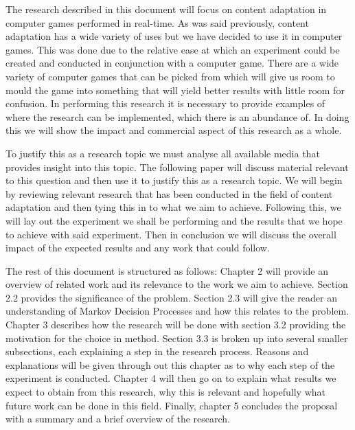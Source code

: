 \documentclass[11pt]{article}
\begin{document}
The research described in this document will focus on content adaptation in computer games performed in real-time. As was said previously, content adaptation has a wide variety of uses but we have decided to use it in computer games. This was done due to the relative ease at which an experiment could be created and conducted in conjunction with a computer game. There are a wide variety of computer games that can be picked from which will give us room to mould the game into something that will yield better results with little room for confusion. In performing this research it is necessary to provide examples of where the research can be implemented, which there is an abundance of. In doing this we will show the impact and commercial aspect of this research as a whole.
\vspace{6.0 mm}

To justify this as a research topic we must analyse all available media that provides insight into this topic. The following paper will discuss material relevant to this question and then use it to justify this as a research topic. We will begin by reviewing relevant research that has been conducted in the field of content adaptation and then tying this in to what we aim to achieve. Following this, we will lay out the experiment we shall be performing and the results that we hope to achieve with said experiment. Then in conclusion we will discuss the overall impact of the expected results and any work that could follow.
\vspace{6.0 mm}

The rest of this document is structured as follows: Chapter 2 will provide an overview of related work and its relevance to the work we aim to achieve. Section 2.2 provides the significance of the problem. Section 2.3 will give the reader an understanding of Markov Decision Processes and how this relates to the problem. Chapter 3 describes how the research will be done with section 3.2 providing the motivation for the choice in method. Section 3.3 is broken up into several smaller subsections, each explaining a step in the research process. Reasons and explanations will be given through out this chapter as to why each step of the experiment is conducted. Chapter 4 will then go on to explain what results we expect to obtain from this research, why this is relevant and hopefully what future work can be done in this field. Finally, chapter 5 concludes the proposal with a summary and a brief overview of the research.
\end{document}
